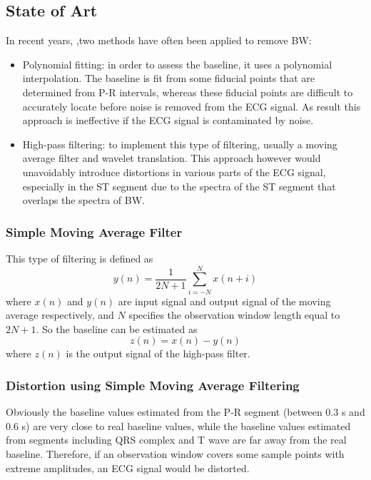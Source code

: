 \subsection{State of Art}
In recent years, ,two methods have often been applied to remove BW:
\begin{itemize}
	\item Polynomial fitting: in order to assess the baseline, it uses a polynomial interpolation. The baseline is fit from some fiducial points that are determined from P-R intervals, whereas these fiducial points are difficult to accurately locate before noise is removed from the ECG signal. As result this approach is ineffective if the ECG signal is contaminated by noise.\cite{ref13}
	\item High-pass filtering: to implement this type of filtering, usually a moving average filter\cite{ref14} and wavelet translation\cite{ref15}. This approach however would unavoidably introduce distortions in various parts of the ECG signal, especially in the ST segment due to the spectra of the ST segment that overlaps the spectra of BW.
\end{itemize}

\subsubsection{Simple Moving Average Filter}
This type of filtering is defined as
\begin{equation}
y(n)=\frac{1}{2N+1}\sum_{i=-N}^{N}x(n+i)
\end{equation}
where $x(n)$ and $y(n)$ are input signal and output signal of the moving average respectively, and $N$ specifies the observation window length equal to $2N+1$. So the baseline can be estimated as
\begin{equation}
z(n)=x(n)-y(n)
\end{equation}
where $z(n)$ is the output signal of the high-pass filter.

\subsubsection{Distortion using Simple Moving Average Filtering}
Obviously the baseline values estimated from the P-R segment (between 0.3 s and 0.6 s) are very close to real baseline values, while the baseline values estimated from segments including QRS complex and T wave are far away from the real baseline. Therefore, if an observation window covers some sample points with extreme amplitudes, an ECG signal would be distorted.


